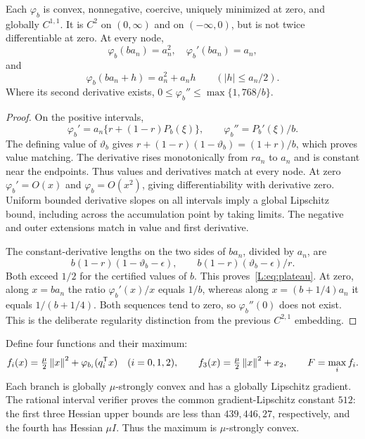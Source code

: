 \begin{lemma}\label{L:lem:scalar}
Each $\varphi_b$ is convex, nonnegative, coercive, uniquely minimized at zero, and globally $C^{1,1}$. It is $C^2$ on $(0,\infty)$ and on $(-\infty,0)$, but is not twice differentiable at zero. At every node,
\[
 \varphi_b(ba_n)=a_n^2,\quad \varphi_b'(ba_n)=a_n,
\]
and
\begin{equation}\label{L:eq:plateau}
 \varphi_b(ba_n+h)=a_n^2+a_nh\qquad (|h|\le a_n/2).
\end{equation}
Where its second derivative exists, $0\le\varphi_b''\le\max\{1,768/b\}$.
\end{lemma}
\begin{proof}
On the positive intervals,
\[
 \varphi_b'=a_n\{r+(1-r)P_b(\xi)\},\qquad
 \varphi_b''=P_b'(\xi)/b.
\]
The defining value of $\vartheta_b$ gives
$r+(1-r)(1-\vartheta_b)=(1+r)/b$, which proves value matching. The derivative rises monotonically from $ra_n$ to $a_n$ and is constant near the endpoints. Thus values and derivatives match at every node. At zero $\varphi_b'=O(x)$ and $\varphi_b=O(x^2)$, giving differentiability with derivative zero. Uniform bounded derivative slopes on all intervals imply a global Lipschitz bound, including across the accumulation point by taking limits. The negative and outer extensions match in value and first derivative.

The constant-derivative lengths on the two sides of $ba_n$, divided by $a_n$, are
\[
 b(1-r)(1-\vartheta_b-\epsilon),\qquad
 b(1-r)(\vartheta_b-\epsilon)/r.
\]
Both exceed $1/2$ for the certified values of $b$. This proves~\eqref{L:eq:plateau}. At zero, along $x=ba_n$ the ratio $\varphi_b'(x)/x$ equals $1/b$, whereas along $x=(b+1/4)a_n$ it equals $1/(b+1/4)$. Both sequences tend to zero, so $\varphi_b''(0)$ does not exist. This is the deliberate regularity distinction from the previous $C^{2,1}$ embedding.
\end{proof}

Define four functions and their maximum:
\begin{equation}\label{L:eq:embedding}
 f_i(x)=\tfrac\mu2\left\lVert x\right\rVert^2+\varphi_{b_i}(q_i^{\mathsf T} x)\quad (i=0,1,2),\qquad
 f_3(x)=\tfrac\mu2\left\lVert x\right\rVert^2+x_2,\qquad F=\max_i f_i.
\end{equation}
Each branch is globally $\mu$-strongly convex and has a globally Lipschitz gradient. The rational interval verifier proves the common gradient-Lipschitz constant $512$: the first three Hessian upper bounds are less than $439,446,27$, respectively, and the fourth has Hessian $\mu I$. Thus the maximum is $\mu$-strongly convex.

